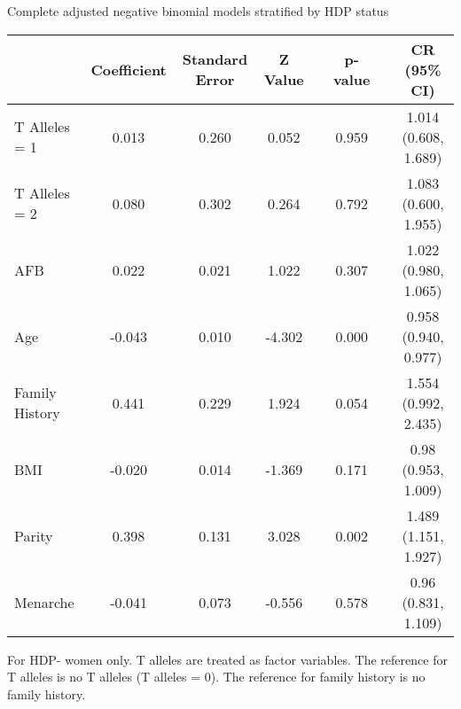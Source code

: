 \documentclass{standalone}
\begin{document}
\begin{threeparttable}
\caption{Complete adjusted negative binomial models stratified by HDP status}
\begin{tabular}{@{}lccccccc@{}}
  \toprule
 & Coefficient & Standard Error & Z Value & \hspace{1em} & p-value & \hspace{1em} & CR (95\% CI) \\ 
  \midrule
  T Alleles = 1\phantom{hdpxx} & 0.013 & 0.260 & 0.052 && 0.959 && 1.014 (0.608, 1.689) \\ 
  T Alleles = 2 & 0.080 & 0.302 & 0.264 && 0.792 && 1.083 (0.600, 1.955) \\ 
  AFB & 0.022 & 0.021 & 1.022 && 0.307 && 1.022 (0.980, 1.065) \\ 
  Age & -0.043 & 0.010 & -4.302 && 0.000 && 0.958 (0.940, 0.977) \\ 
  Family History & 0.441 & 0.229 & 1.924 && 0.054 && 1.554 (0.992, 2.435) \\ 
  BMI & -0.020 & 0.014 & -1.369 && 0.171 && 0.98 (0.953, 1.009) \\ 
  Parity & 0.398 & 0.131 & 3.028 && 0.002 && 1.489 (1.151, 1.927) \\ 
  Menarche & -0.041 & 0.073 & -0.556 && 0.578 && 0.96 (0.831, 1.109) \\
   \bottomrule
\end{tabular}
\begin{tablenotes}
\small
\item For HDP- women only. T alleles are treated as factor variables. The reference for T alleles is no T alleles (T alleles = 0). The reference for family history is no family history.
\end{tablenotes}
\end{threeparttable}
\end{document}

